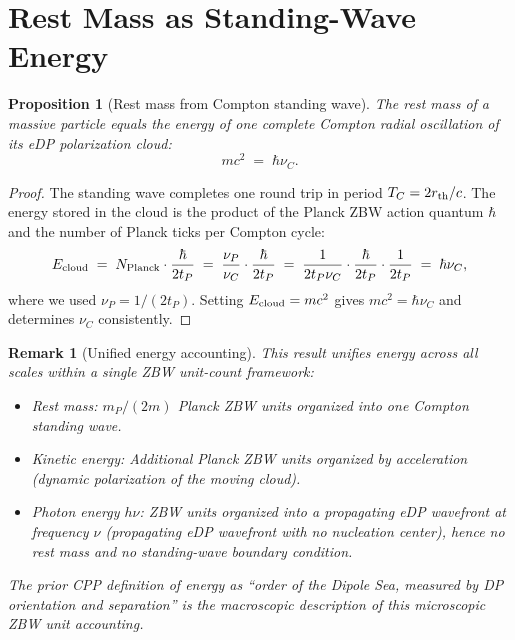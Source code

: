 \documentclass[12pt]{article}
\newtheorem{proposition}[theorem]{Proposition}
\newtheorem{remark}[theorem]{Remark}
\newcommand{\tP}{t_P}
\newcommand{\mP}{m_P}
\newcommand{\nuP}{\nu_P}
\newcommand{\nuC}{\nu_C}
\begin{document}
\section{Rest Mass as Standing-Wave Energy}
\label{sec:mass}

\begin{proposition}[Rest mass from Compton standing wave]
\label{prop:mass}
The rest mass of a massive particle equals the energy of one complete
Compton radial oscillation of its eDP polarization cloud:
\begin{equation}
  mc^2 \;=\; \hbar\nuC.
  \label{eq:mc2}
\end{equation}
\end{proposition}

\begin{proof}
The standing wave completes one round trip in period $T_C = 2r_{\rm
th}/c$.  The energy stored in the cloud is the product of the Planck ZBW
action quantum $\hbar$ and the number of Planck ticks per Compton cycle:
\begin{equation}
  E_{\rm cloud} \;=\; N_{\rm Planck}\cdot\frac{\hbar}{2\tP}
  \;=\; \frac{\nuP}{\nuC}\cdot\frac{\hbar}{2\tP}
  \;=\; \frac{1}{2\tP\nuC}\cdot\frac{\hbar}{2\tP}\cdot\frac{1}{2\tP}
  \;=\; \hbar\nuC,
  \label{eq:E-cloud}
\end{equation}
where we used $\nuP = 1/(2\tP)$.  Setting $E_{\rm cloud} = mc^2$ gives
$mc^2 = \hbar\nuC$ and determines $\nuC$ consistently.
\end{proof}

\begin{remark}[Unified energy accounting]
This result unifies energy across all scales within a single ZBW unit-count
framework:
\begin{itemize}[noitemsep]
  \item \emph{Rest mass:} $\mP/(2m)$ Planck ZBW units organized into one
    Compton standing wave.
  \item \emph{Kinetic energy:} Additional Planck ZBW units organized by
    acceleration (dynamic polarization of the moving cloud).
  \item \emph{Photon energy $h\nu$:} ZBW units organized into a propagating
    eDP wavefront at frequency $\nu$ (propagating eDP wavefront with no
    nucleation center), hence no rest mass and no standing-wave boundary
    condition.
\end{itemize}
The prior CPP definition of energy as ``order of the Dipole Sea, measured
by DP orientation and separation'' is the macroscopic description of this
microscopic ZBW unit accounting.
\end{remark}
\end{document}
